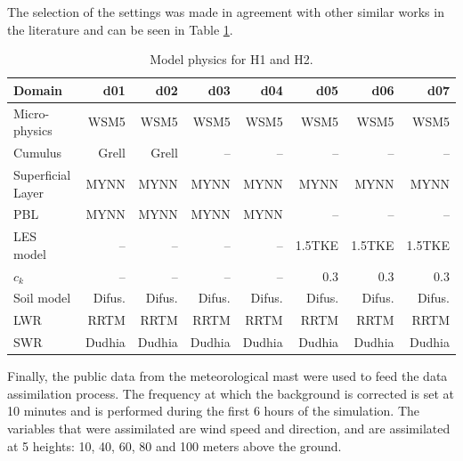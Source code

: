 The selection of the settings was made in agreement with other similar works in the literature and can be seen in Table \ref{tab:05_param_hov}.
\begin{table}
	\caption{Model physics for H1 and H2.}\label{tab:05_param_hov}
	\centering
	\begin{tabular}{lrrrrrrr}
		\toprule
		Domain 				& d01	&	d02	&	d03	&	d04	&	d05	&	d06 &	d07 \\
		\midrule
		Micro-physics		 	& WSM5 & WSM5 & WSM5 &WSM5&WSM5&WSM5&WSM5  \\
		Cumulus			 		& Grell & Grell & -- & -- & -- & -- & -- \\ 
		Superficial Layer	& MYNN & MYNN & MYNN & MYNN & MYNN & MYNN & MYNN \\
		PBL				 		& MYNN & MYNN & MYNN & MYNN & -- & -- & -- \\
		LES model				 		& -- & -- & -- & -- & 1.5TKE & 1.5TKE & 1.5TKE \\
		$c_k$				 		& -- & -- & -- & -- & 0.3 & 0.3 & 0.3 \\
		Soil model 		& Difus. & Difus. & Difus. & Difus. & Difus. & Difus. & Difus. \\
		LWR & RRTM &RRTM&RRTM&RRTM&RRTM&RRTM&RRTM \\
		SWR	& Dudhia &Dudhia&Dudhia&Dudhia&Dudhia&Dudhia&Dudhia \\
		\bottomrule
	\end{tabular}
\end{table}

Finally, the public data from the meteorological mast were used to feed the data assimilation process. The frequency at which the background is corrected is set at 10 minutes and is performed during the first 6 hours of the simulation. The variables that were assimilated are wind speed and direction, and are assimilated at 5 heights: 10, 40, 60, 80 and 100 meters above the ground.





